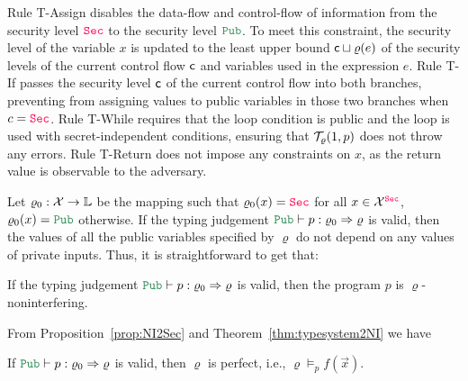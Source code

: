 Rule {\sc T-Assign} disables the data-flow and control-flow of information from the security level $\Sec$
to the security level $\Pub$. To meet this constraint, the security level of the variable $x$ is updated to the least upper bound ${\sf c}\sqcup \varrho(e)$ of
the security levels of the current control flow ${\sf c}$ and variables used in the expression $e$.
Rule {\sc T-If} passes the security level ${\sf c}$ of the current control flow into both branches, preventing from assigning values to public variables in those two branches when $c=\Sec$.
Rule {\sc T-While} requires that the loop condition is public
and the loop is used with secret-independent conditions,
ensuring that $\mathcal{T}_\varrho(1,p)$ does not throw any errors.
Rule {\sc T-Return} does not impose any constraints on $x$, as
the return value is observable to the adversary.

Let $\varrho_0:\mathcal{X}\rightarrow \mathbb{L}$ be the mapping such that $\varrho_0(x)=\Sec$ for all $x\in \Var^{\Sec}$,
$\varrho_0(x)=\Pub$ otherwise.
If the typing judgement $\Pub\vdash p:\varrho_0\Rightarrow\varrho$ is valid, then
the values of all the public variables specified by $\varrho$ do not depend on any values of private inputs.
Thus, it is straightforward to get that:

\begin{proposition}\label{thm:typesystem2NI}
If the typing judgement  $\Pub\vdash p:\varrho_0\Rightarrow\varrho$ is valid, then the program $p$ is $\varrho$-noninterfering.
\end{proposition}

From Proposition~\ref{prop:NI2Sec} and Theorem~\ref{thm:typesystem2NI} we have

\begin{corollary}\label{coro:typesystem2Leak}
If $\Pub\vdash p:\varrho_0\Rightarrow\varrho$ is valid, then $\varrho$ is perfect, i.e., $\varrho\models_p f(\vec{x})$.
\end{corollary}


